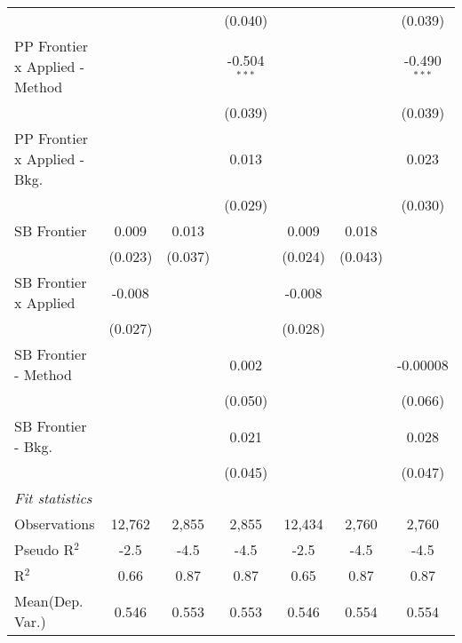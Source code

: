 \begin{tabular}{lcccccc}
                                  &                &              & (0.040)        &                &              & (0.039)\\   
   PP Frontier x Applied - Method &                &              & -0.504$^{***}$ &                &              & -0.490$^{***}$\\   
                                  &                &              & (0.039)        &                &              & (0.039)\\   
   PP Frontier x Applied - Bkg.   &                &              & 0.013          &                &              & 0.023\\   
                                  &                &              & (0.029)        &                &              & (0.030)\\   
   SB Frontier                    & 0.009          & 0.013        &                & 0.009          & 0.018        &   \\   
                                  & (0.023)        & (0.037)      &                & (0.024)        & (0.043)      &   \\   
   SB Frontier x Applied          & -0.008         &              &                & -0.008         &              &   \\   
                                  & (0.027)        &              &                & (0.028)        &              &   \\   
   SB Frontier - Method           &                &              & 0.002          &                &              & -0.00008\\   
                                  &                &              & (0.050)        &                &              & (0.066)\\   
   SB Frontier - Bkg.             &                &              & 0.021          &                &              & 0.028\\   
                                  &                &              & (0.045)        &                &              & (0.047)\\   
   \midrule
   \emph{Fit statistics}\\
   Observations                   & 12,762         & 2,855        & 2,855          & 12,434         & 2,760        & 2,760\\  
   Pseudo R$^2$                   & -2.5           & -4.5         & -4.5           & -2.5           & -4.5         & -4.5\\  
   R$^2$                          & 0.66           & 0.87         & 0.87           & 0.65           & 0.87         & 0.87\\  
Mean(Dep. Var.) & 0.546 & 0.553 & 0.553 & 0.546 & 0.554 & 0.554 \\
   

\end{tabular}
